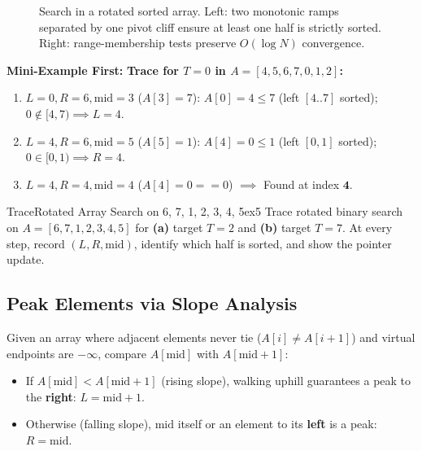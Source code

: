 \documentclass[11pt,a4paper]{article}
\theoremstyle{definition}
\newcommand{\examplebeat}{\textbf{\color{primaryblue}Mini-Example First:} }
\begin{document}
\begin{figure}[htbp]
\caption{Search in a rotated sorted array. Left: two monotonic ramps separated by one pivot cliff ensure at least one half is strictly sorted. Right: range-membership tests preserve $O(\log N)$ convergence.}
\label{fig:bs-rotated-array}
\end{figure}

\examplebeat \textbf{Trace for $T = 0$ in $A = [4, 5, 6, 7, 0, 1, 2]$:}
\begin{enumerate}
    \item $L = 0, R = 6, \text{mid} = 3$ ($A[3] = 7$): $A[0] = 4 \le 7$ (left $[4..7]$ sorted); $0 \notin [4, 7) \implies L = 4$.
    \item $L = 4, R = 6, \text{mid} = 5$ ($A[5] = 1$): $A[4] = 0 \le 1$ (left $[0, 1]$ sorted); $0 \in [0, 1) \implies R = 4$.
    \item $L = 4, R = 4, \text{mid} = 4$ ($A[4] = 0 == 0$) $\implies$ Found at index $\mathbf{4}$.
\end{enumerate}

\begin{tryitbox}{Trace}{Rotated Array Search on 6, 7, 1, 2, 3, 4, 5}{ex5}
Trace rotated binary search on $A = [6, 7, 1, 2, 3, 4, 5]$ for \textbf{(a)} target $T = 2$ and \textbf{(b)} target $T = 7$. At every step, record $(L, R, \text{mid})$, identify which half is sorted, and show the pointer update.
\end{tryitbox}

\subsection{Peak Elements via Slope Analysis}

Given an array where adjacent elements never tie ($A[i] \neq A[i+1]$) and virtual endpoints are $-\infty$, compare $A[\text{mid}]$ with $A[\text{mid} + 1]$:
\begin{itemize}
    \item If $A[\text{mid}] < A[\text{mid} + 1]$ (rising slope), walking uphill guarantees a peak to the \textbf{right}: $L = \text{mid} + 1$.
    \item Otherwise (falling slope), $\text{mid}$ itself or an element to its \textbf{left} is a peak: $R = \text{mid}$.
\end{itemize}
\end{document}
